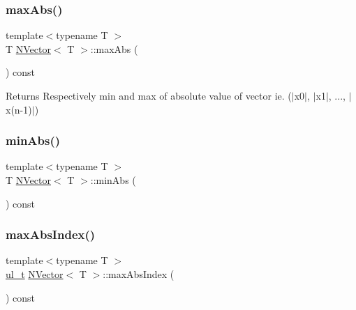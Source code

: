 \mbox{\label{class_n_vector_a2d77a1ff10574ae5ca33fb3c11a087e2}} 
\subsubsection{\texorpdfstring{maxAbs()}{maxAbs()}}
{\footnotesize\ttfamily template$<$typename T $>$ \\
T \mbox{\hyperlink{class_n_vector}{N\+Vector}}$<$ T $>$\+::max\+Abs (\begin{DoxyParamCaption}{ }\end{DoxyParamCaption}) const}

\begin{DoxyReturn}{Returns}
Respectively min and max of absolute value of vector ie. ($\vert$x0$\vert$, $\vert$x1$\vert$, ..., $\vert$x(n-\/1)$\vert$) 
\end{DoxyReturn}
\mbox{\label{class_n_vector_a857878b360cede51eb87924cd46d5a54}} 
\subsubsection{\texorpdfstring{minAbs()}{minAbs()}}
{\footnotesize\ttfamily template$<$typename T $>$ \\
T \mbox{\hyperlink{class_n_vector}{N\+Vector}}$<$ T $>$\+::min\+Abs (\begin{DoxyParamCaption}{ }\end{DoxyParamCaption}) const}

\mbox{\label{class_n_vector_ac7d7d39b68956da9018684a3706a70c2}} 
\subsubsection{\texorpdfstring{maxAbsIndex()}{maxAbsIndex()}}
{\footnotesize\ttfamily template$<$typename T $>$ \\
\mbox{\hyperlink{typedef_8h_a1b140a2034db3f5dfe18a987745df43a}{ul\+\_\+t}} \mbox{\hyperlink{class_n_vector}{N\+Vector}}$<$ T $>$\+::max\+Abs\+Index (\begin{DoxyParamCaption}{ }\end{DoxyParamCaption}) const}

